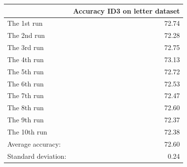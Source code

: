 \begin{tabular}{lr}
\toprule
{} &  Accuracy ID3 on letter dataset \\
\midrule
The 1st run         &                           72.74 \\
The 2nd run         &                           72.28 \\
The 3rd run         &                           72.75 \\
The 4th run         &                           73.13 \\
The 5th run         &                           72.72 \\
The 6th run         &                           72.53 \\
The 7th run         &                           72.47 \\
The 8th run         &                           72.60 \\
The 9th run         &                           72.37 \\
The 10th run        &                           72.38 \\
Average accuracy:   &                           72.60 \\
Standard deviation: &                            0.24 \\
\bottomrule
\end{tabular}
